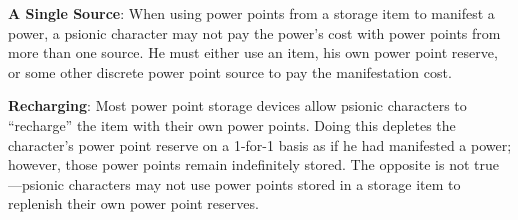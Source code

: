 \textbf{A Single Source}: When using power points from a storage item to manifest a power, a psionic character may not pay the power's cost with power points from more than one source. He must either use an item, his own power point reserve, or some other discrete power point source to pay the manifestation cost.

\textbf{Recharging}: Most power point storage devices allow psionic characters to ``recharge'' the item with their own power points. Doing this depletes the character's power point reserve on a 1-for-1 basis as if he had manifested a power; however, those power points remain indefinitely stored. The opposite is not true---psionic characters may not use power points stored in a storage item to replenish their own power point reserves.

